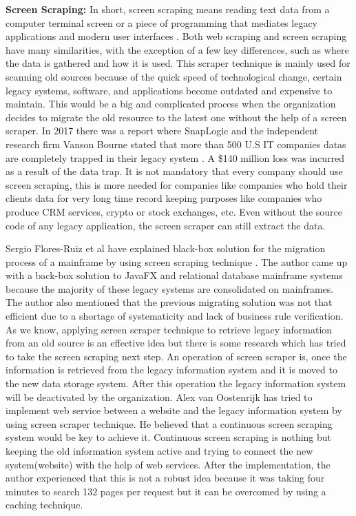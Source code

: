 {\bf Screen Scraping:} In short, screen scraping means reading text data from a computer terminal screen or a piece of programming that mediates legacy applications and modern user interfaces \cite{Alex2021}. Both web scraping and screen scraping have many similarities, with the exception of a few key differences, such as where the data is gathered and how it is used. This scraper technique is mainly used for scanning old sources because of the quick speed of technological change, certain legacy systems, software, and applications become outdated and expensive to maintain. This would be a big and complicated process when the organization decides to migrate the old resource to the latest one without the help of a screen scraper. In 2017 there was a report where SnapLogic and the independent research firm Vanson Bourne stated that more than 500 U.S IT companies datas are completely trapped in their legacy system \cite{Snap}. A \$140 million loss was incurred as a result of the data trap. It is not mandatory that every company should use screen scraping, this is more needed for companies like companies who hold their clients data for very long time record keeping purposes like companies who produce CRM services, crypto or stock exchanges, etc. Even without the source code of any legacy application, the screen scraper can still extract the data. 

Sergio Flores-Ruiz et al have explained black-box solution for the migration process of a mainframe by using screen scraping technique \cite{FlPeDoPu2018}. The author came up with a back-box solution to JavaFX and relational database mainframe systems because the majority of these legacy systems are consolidated on mainframes. The author also mentioned that the previous migrating solution was not that efficient due to a shortage of systematicity and lack of business rule verification. As we know, applying screen scraper technique to retrieve legacy information from an old source is an effective idea but there is some research which has tried to take the screen scraping next step. An operation of screen scraper is, once the information is retrieved from the legacy information system and it is moved to the new data storage system. After this operation the legacy information system will be deactivated by the organization. Alex van Oostenrijk \cite{Alex2004} has tried to implement web service between a website and the legacy information system by using screen scraper technique. He believed that a continuous screen scraping system would be key to achieve it. Continuous screen scraping is nothing but keeping the old information system active and trying to connect the new system(website) with the help of web services. After the implementation, the author experienced that this is not a robust idea because it was taking four minutes to search 132 pages per request but it can be overcomed by using a caching technique.

